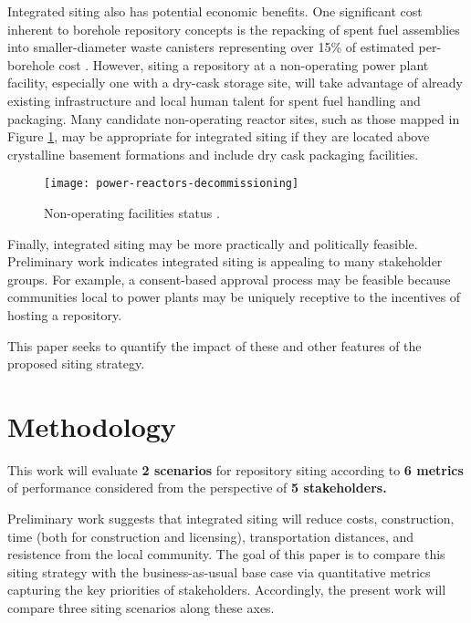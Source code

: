 Integrated siting also has potential economic benefits. One significant cost 
inherent to borehole repository concepts is the repacking of spent fuel 
assemblies into smaller-diameter waste canisters representing over 15\% of 
estimated per-borehole cost \cite{arnold_reference_2011}.  However, siting a 
repository at a non-operating power plant facility, especially one with a 
dry-cask storage site, will take advantage of already existing infrastructure 
and local human talent for spent fuel handling and packaging. Many candidate 
non-operating reactor sites, such as those mapped in Figure \ref{fig:shutdown}, 
may be appropriate for integrated siting if they are located above crystalline 
basement formations and include dry cask packaging facilities.

\begin{figure}[htpb!] 
  \centering
  \texttt{[image: power-reactors-decommissioning]}	
  \caption{Non-operating facilities status
  \cite{nuclear_regulatory_commission_nrc_2015}.}
  \label{fig:shutdown}
\end{figure}

Finally, integrated siting may be more practically and politically feasible. 
Preliminary work \cite{waleed_regional_2015} indicates integrated siting is 
appealing to many stakeholder groups. For example, a consent-based approval 
process may be feasible because communities local to power plants may be 
uniquely receptive to the incentives of hosting a repository. 

This paper seeks to quantify the impact of these and other features of the 
proposed siting strategy. 


\section{Methodology}

This work will evaluate \textbf{2 scenarios} for repository siting according to \textbf{6 metrics} of 
performance considered from the perspective of \textbf{5 stakeholders.}

Preliminary work \cite{waleed_regional_2015} suggests that integrated siting 
will reduce costs, construction, time (both for construction and licensing), 
transportation distances, and resistence from the local community.  
The goal of this paper is to compare this siting strategy with the 
business-as-usual base case via quantitative metrics capturing the key 
priorities of stakeholders. Accordingly, the present 
work will compare three siting scenarios along these axes. 

